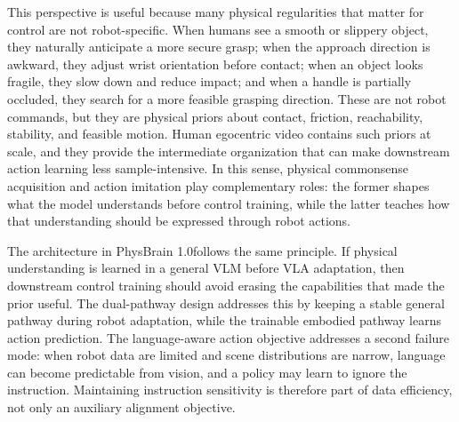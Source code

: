 This perspective is useful because many physical regularities that matter for control are not robot-specific. When humans see a smooth or slippery object, they naturally anticipate a more secure grasp; when the approach direction is awkward, they adjust wrist orientation before contact; when an object looks fragile, they slow down and reduce impact; and when a handle is partially occluded, they search for a more feasible grasping direction. These are not robot commands, but they are physical priors about contact, friction, reachability, stability, and feasible motion. Human egocentric video contains such priors at scale, and they provide the intermediate organization that can make downstream action learning less sample-intensive. In this sense, physical commonsense acquisition and action imitation play complementary roles: the former shapes what the model understands before control training, while the latter teaches how that understanding should be expressed through robot actions.

The architecture in PhysBrain 1.0follows the same principle. If physical understanding is learned in a general VLM before VLA adaptation, then downstream control training should avoid erasing the capabilities that made the prior useful. The dual-pathway design addresses this by keeping a stable general pathway during robot adaptation, while the trainable embodied pathway learns action prediction. The language-aware action objective addresses a second failure mode: when robot data are limited and scene distributions are narrow, language can become predictable from vision, and a policy may learn to ignore the instruction. Maintaining instruction sensitivity is therefore part of data efficiency, not only an auxiliary alignment objective.


